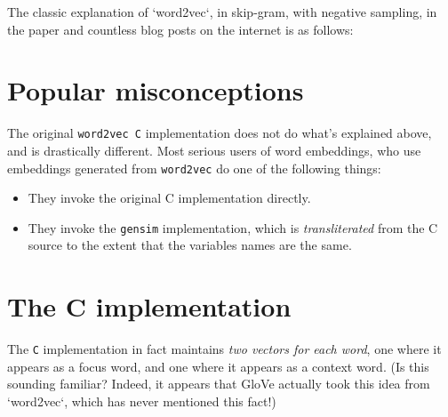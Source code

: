 \documentclass[11pt]{book}
\newcommand{\wtov}{\texttt{word2vec }}
\begin{document}
The classic explanation of `word2vec`, in skip-gram, with negative sampling,
in the paper and countless blog posts on the internet is as follows:

\section{Popular misconceptions}

% 

The original \wtov \texttt{C} implementation does not do what's explained above,
and is drastically different. Most serious users of word embeddings, who use
embeddings generated from \texttt{word2vec} do one of the following things:

\begin{itemize}
\item They invoke the original C implementation directly.
\item They invoke the \texttt{gensim} implementation, which is
\emph{transliterated} from the C source to the extent that the variables names
are the same.
\end{itemize}

\section{The C implementation}

The \texttt{C} implementation in fact maintains \emph{two vectors for each word}, one where
it appears as a focus word, and one where it appears as a context word.
(Is this sounding familiar? Indeed, it appears that GloVe actually took this
idea from `word2vec`, which has never mentioned this fact!)
\end{document}
